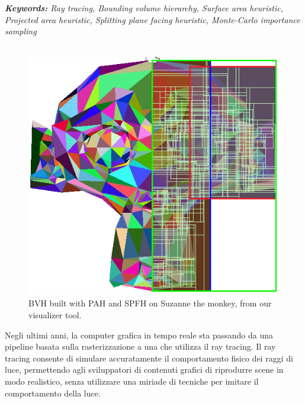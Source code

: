 \documentclass{PoliMi_MasterThesis}
\begin{document}
\small
\textit{\textbf{Keywords:} Ray tracing, Bounding volume hierarchy, Surface area heuristic, Projected area heuristic, Splitting plane facing heuristic, Monte-Carlo importance sampling}
\normalsize
\\\\
\begin{figure}[H]
    \centering
    \includegraphics[width=\textwidth*\real{0.55}]{Images/abstract_image.png}
	\caption{BVH built with PAH and SPFH on Suzanne the monkey, from our visualizer tool.}
\end{figure}


\makeatletter
\let\savedchap\@makechapterhead
\def\@makechapterhead{\savedchap}
\let\@makechapterhead\savedchap
\makeatletter


Negli ultimi anni, la computer grafica in tempo reale sta passando da una pipeline basata sulla rasterizzazione a una che utilizza il ray tracing. Il ray tracing consente di simulare accuratamente il comportamento fisico dei raggi di luce, permettendo agli sviluppatori di contenuti grafici di riprodurre scene in modo realistico, senza utilizzare una miriade di tecniche per imitare il comportamento della luce.
\end{document}
